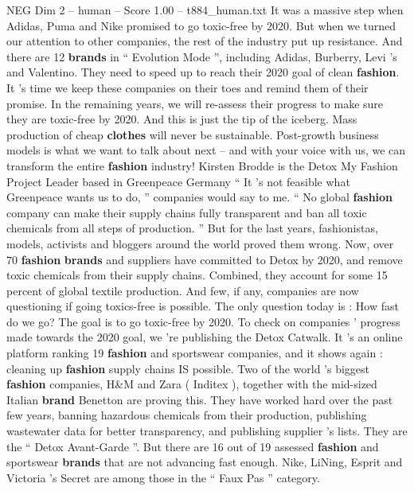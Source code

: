 \begin{textsample}{NEG Dim 2 – human – Score 1.00 – t884\_human.txt}  \label{ex:f2_neg_034}
It was a massive step when Adidas, Puma and Nike promised to go toxic-free by 2020.
But when we turned our attention to other companies, the rest of the industry put up resistance.
And there are 12 \textbf{brands} in “ Evolution Mode ”, including Adidas, Burberry, Levi ’s and Valentino.
They need to speed up to reach their 2020 goal of clean \textbf{fashion}.
It ’s time we keep these companies on their toes and remind them of their promise.
In the remaining years, we will re-assess their progress to make sure they are toxic-free by 2020.
And this is just the tip of the iceberg.
Mass production of cheap \textbf{clothes} will never be sustainable.
Post-growth business models is what we want to talk about next – and with your voice with us, we can transform the entire \textbf{fashion} industry!
Kirsten Brodde is the Detox My Fashion Project Leader based in Greenpeace Germany “ It ’s not feasible what Greenpeace wants us to do, ” companies would say to me. “ No global \textbf{fashion} company can make their supply chains fully transparent and ban all toxic chemicals from all steps of production. ” But for the last years, fashionistas, models, activists and bloggers around the world proved them wrong.
Now, over 70 \textbf{fashion} \textbf{brands} and suppliers have committed to Detox by 2020, and remove toxic chemicals from their supply chains.
Combined, they account for some 15 percent of global textile production.
And few, if any, companies are now questioning if going toxics-free is possible.
The only question today is : How fast do we go?
The goal is to go toxic-free by 2020.
To check on companies ’ progress made towards the 2020 goal, we ’re publishing the Detox Catwalk.
It ’s an online platform ranking 19 \textbf{fashion} and sportswear companies, and it shows again : cleaning up \textbf{fashion} supply chains IS possible.
Two of the world ’s biggest \textbf{fashion} companies, H\&M and Zara ( Inditex ), together with the mid-sized Italian \textbf{brand} Benetton are proving this.
They have worked hard over the past few years, banning hazardous chemicals from their production, publishing wastewater data for better transparency, and publishing supplier ’s lists.
They are the “ Detox Avant-Garde ”.
But there are 16 out of 19 assessed \textbf{fashion} and sportswear \textbf{brands} that are not advancing fast enough.
Nike, LiNing, Esprit and Victoria ’s Secret are among those in the “ Faux Pas ” category.

\end{textsample}
